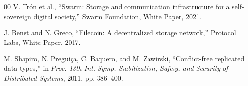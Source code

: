 \documentclass[conference]{IEEEtran}
\begin{document}
\begin{thebibliography}{00}
V. Tr\'on et al., ``Swarm: Storage and communication infrastructure for a
self-sovereign digital society,'' Swarm Foundation, White Paper, 2021.

J. Benet and N. Greco, ``Filecoin: A decentralized storage network,''
Protocol Labs, White Paper, 2017.

M. Shapiro, N. Pregui\c{c}a, C. Baquero, and M. Zawirski,
``Conflict-free replicated data types,'' in \emph{Proc. 13th Int. Symp.
Stabilization, Safety, and Security of Distributed Systems}, 2011,
pp. 386--400.

\end{thebibliography}
\end{document}
